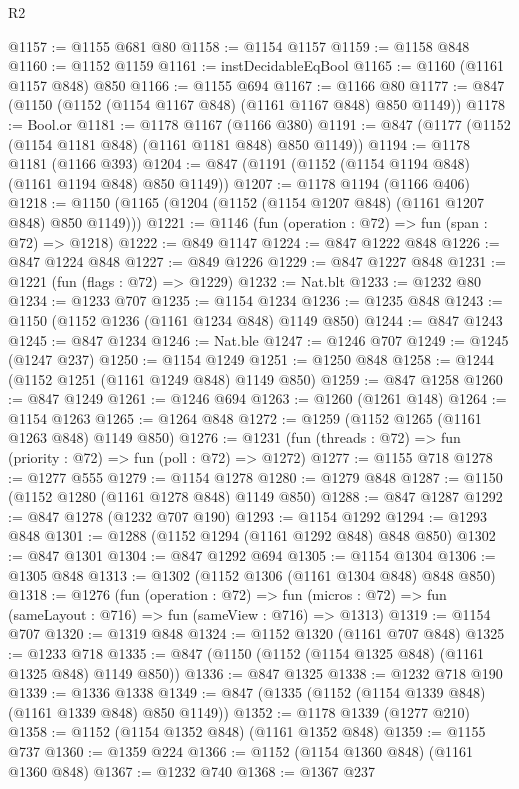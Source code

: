 \begin{lexlean}{R2}
\begin{coremodule}
@1157 := @1155 @681 @80
@1158 := @1154 @1157
@1159 := @1158 @848
@1160 := @1152 @1159
@1161 := instDecidableEqBool
@1165 := @1160 (@1161 @1157 @848) @850
@1166 := @1155 @694
@1167 := @1166 @80
@1177 := @847 (@1150 (@1152 (@1154 @1167 @848) (@1161 @1167 @848) @850 @1149))
@1178 := Bool.or
@1181 := @1178 @1167 (@1166 @380)
@1191 := @847 (@1177 (@1152 (@1154 @1181 @848) (@1161 @1181 @848) @850 @1149))
@1194 := @1178 @1181 (@1166 @393)
@1204 := @847 (@1191 (@1152 (@1154 @1194 @848) (@1161 @1194 @848) @850 @1149))
@1207 := @1178 @1194 (@1166 @406)
@1218 := @1150 (@1165 (@1204 (@1152 (@1154 @1207 @848) (@1161 @1207 @848) @850 @1149)))
@1221 := @1146 (fun (operation : @72) => fun (span : @72) => @1218)
@1222 := @849 @1147
@1224 := @847 @1222 @848
@1226 := @847 @1224 @848
@1227 := @849 @1226
@1229 := @847 @1227 @848
@1231 := @1221 (fun (flags : @72) => @1229)
@1232 := Nat.blt
@1233 := @1232 @80
@1234 := @1233 @707
@1235 := @1154 @1234
@1236 := @1235 @848
@1243 := @1150 (@1152 @1236 (@1161 @1234 @848) @1149 @850)
@1244 := @847 @1243
@1245 := @847 @1234
@1246 := Nat.ble
@1247 := @1246 @707
@1249 := @1245 (@1247 @237)
@1250 := @1154 @1249
@1251 := @1250 @848
@1258 := @1244 (@1152 @1251 (@1161 @1249 @848) @1149 @850)
@1259 := @847 @1258
@1260 := @847 @1249
@1261 := @1246 @694
@1263 := @1260 (@1261 @148)
@1264 := @1154 @1263
@1265 := @1264 @848
@1272 := @1259 (@1152 @1265 (@1161 @1263 @848) @1149 @850)
@1276 := @1231 (fun (threads : @72) => fun (priority : @72) => fun (poll : @72) => @1272)
@1277 := @1155 @718
@1278 := @1277 @555
@1279 := @1154 @1278
@1280 := @1279 @848
@1287 := @1150 (@1152 @1280 (@1161 @1278 @848) @1149 @850)
@1288 := @847 @1287
@1292 := @847 @1278 (@1232 @707 @190)
@1293 := @1154 @1292
@1294 := @1293 @848
@1301 := @1288 (@1152 @1294 (@1161 @1292 @848) @848 @850)
@1302 := @847 @1301
@1304 := @847 @1292 @694
@1305 := @1154 @1304
@1306 := @1305 @848
@1313 := @1302 (@1152 @1306 (@1161 @1304 @848) @848 @850)
@1318 := @1276
    (fun (operation : @72) =>
    fun (micros : @72) => fun (sameLayout : @716) => fun (sameView : @716) => @1313)
@1319 := @1154 @707
@1320 := @1319 @848
@1324 := @1152 @1320 (@1161 @707 @848)
@1325 := @1233 @718
@1335 := @847 (@1150 (@1152 (@1154 @1325 @848) (@1161 @1325 @848) @1149 @850))
@1336 := @847 @1325
@1338 := @1232 @718 @190
@1339 := @1336 @1338
@1349 := @847 (@1335 (@1152 (@1154 @1339 @848) (@1161 @1339 @848) @850 @1149))
@1352 := @1178 @1339 (@1277 @210)
@1358 := @1152 (@1154 @1352 @848) (@1161 @1352 @848)
@1359 := @1155 @737
@1360 := @1359 @224
@1366 := @1152 (@1154 @1360 @848) (@1161 @1360 @848)
@1367 := @1232 @740
@1368 := @1367 @237

\end{coremodule}
\end{lexlean}
